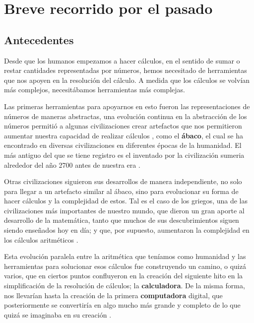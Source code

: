 \documentclass[letterpaper,12pt,oneside]{book}
\begin{document}
	\section{Breve recorrido por el pasado}
		\subsection{Antecedentes}
		
		Desde que los humanos empezamos a hacer cálculos, en el sentido de sumar o restar cantidades representadas por números, hemos necesitado de herramientas
		que nos apoyen en la resolución del cálculo. A medida que los cálculos se volvían más complejos, necesitábamos herramientas más complejas. 
		
		Las
		primeras herramientas para apoyarnos en esto fueron las representaciones de números de maneras abstractas, una evolución continua en la abstracción
		de los números permitió a algunas civilizaciones crear artefactos que nos permitieron aumentar nuestra capacidad de realizar cálculos
		, como el \textbf{ábaco}, el cual se ha encontrado
		en diversas civilizaciones en diferentes épocas de la humanidad. El más antiguo del que se tiene registro es el inventado por la civilización
		sumeria alrededor del año 2700 antes de nuestra era \cite{ifrah_universal_2001}.
  
        Otras civilizaciones siguieron sus desarrollos de manera independiente, no solo para llegar a un artefacto
		similar al ábaco, sino para evolucionar su forma de hacer cálculos y la complejidad de estos. Tal es el caso de los griegos, una de las civilizaciones
		más importantes de nuestro mundo, que dieron un gran aporte al desarrollo de la matemática, tanto que muchos de sus descubrimientos siguen siendo
		enseñados hoy en día; y que, por supuesto, aumentaron la complejidad en los cálculos aritméticos \cite{ifrah_universal_2001}.
  
        Esta evolución paralela entre la aritmética que teníamos como humanidad 
		y las herramientas para solucionar esos cálculos
		fue construyendo un camino, o quizá varios, que en ciertos puntos confluyeron en la creación del siguiente hito en la simplificación de la resolución
		de cálculos; la \textbf{calculadora}. De la misma forma, nos llevarían hasta la creación de la primera \textbf{computadora} digital, que posteriormente se convertiría
		en algo mucho más grande y completo de lo que quizá se imaginaba en su creación \cite{ifrah_universal_2001}.
		
\end{document}
